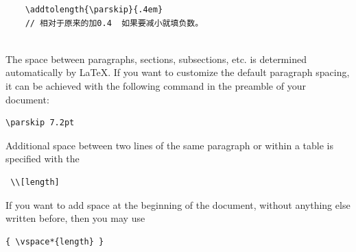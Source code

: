 \documentclass[UTF8]{book}
\begin{document}
{\begin{lstlisting}
	\addtolength{\parskip}{.4em}
	// 相对于原来的加0.4  如果要减小就填负数。
	
	\end{lstlisting}
	
The space between paragraphs, sections, subsections, etc. is determined automatically by LaTeX. If you want to customize the default paragraph spacing, it can be achieved with the following command in the preamble of your document:
\begin{lstlisting}
\parskip 7.2pt
\end{lstlisting}
Additional space between two lines of the same paragraph or within a table is specified with the
\begin{lstlisting}
 \\[length] 
\end{lstlisting}
If you want to add space at the beginning of the document, without anything else written before, then you may use
\begin{lstlisting}
{ \vspace*{length} } 
\end{lstlisting}
}
\vspace*{4em}
\end{document}
